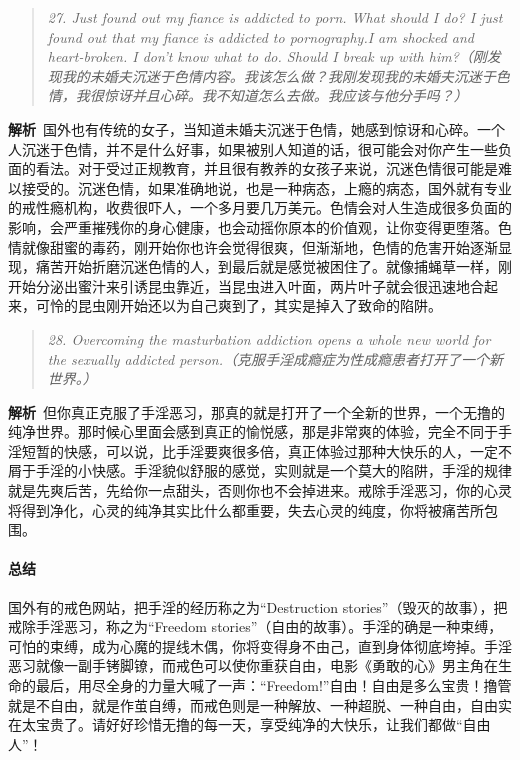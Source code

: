 \begin{quote}\it
    27. Just found out my fiance is addicted to porn. What should I do? I just found out that my fiance is addicted to pornography.I am shocked and heart-broken. I don't know what to do. Should I break up with him?（刚发现我的未婚夫沉迷于色情内容。我该怎么做？我刚发现我的未婚夫沉迷于色情，我很惊讶并且心碎。我不知道怎么去做。我应该与他分手吗？）
\end{quote}

\textbf{解析}\ 国外也有传统的女子，当知道未婚夫沉迷于色情，她感到惊讶和心碎。一个人沉迷于色情，并不是什么好事，如果被别人知道的话，很可能会对你产生一些负面的看法。对于受过正规教育，并且很有教养的女孩子来说，沉迷色情很可能是难以接受的。沉迷色情，如果准确地说，也是一种病态，上瘾的病态，国外就有专业的戒性瘾机构，收费很吓人，一个多月要几万美元。色情会对人生造成很多负面的影响，会严重摧残你的身心健康，也会动摇你原本的价值观，让你变得更堕落。色情就像甜蜜的毒药，刚开始你也许会觉得很爽，但渐渐地，色情的危害开始逐渐显现，痛苦开始折磨沉迷色情的人，到最后就是感觉被困住了。就像捕蝇草一样，刚开始分泌出蜜汁来引诱昆虫靠近，当昆虫进入叶面，两片叶子就会很迅速地合起来，可怜的昆虫刚开始还以为自己爽到了，其实是掉入了致命的陷阱。

\begin{quote}\it
    28. Overcoming the masturbation addiction opens a whole new world for the sexually addicted person.（克服手淫成瘾症为性成瘾患者打开了一个新世界。）
\end{quote}

\textbf{解析}\ 但你真正克服了手淫恶习，那真的就是打开了一个全新的世界，一个无撸的纯净世界。那时候心里面会感到真正的愉悦感，那是非常爽的体验，完全不同于手淫短暂的快感，可以说，比手淫要爽很多倍，真正体验过那种大快乐的人，一定不屑于手淫的小快感。手淫貌似舒服的感觉，实则就是一个莫大的陷阱，手淫的规律就是先爽后苦，先给你一点甜头，否则你也不会掉进来。戒除手淫恶习，你的心灵将得到净化，心灵的纯净其实比什么都重要，失去心灵的纯度，你将被痛苦所包围。

\paragraph*{总结}

国外有的戒色网站，把手淫的经历称之为“Destruction stories”（毁灭的故事），把戒除手淫恶习，称之为“Freedom stories”（自由的故事）。手淫的确是一种束缚，可怕的束缚，成为心魔的提线木偶，你将变得身不由己，直到身体彻底垮掉。手淫恶习就像一副手铐脚镣，而戒色可以使你重获自由，电影《勇敢的心》男主角在生命的最后，用尽全身的力量大喊了一声：“Freedom!”自由！自由是多么宝贵！撸管就是不自由，就是作茧自缚，而戒色则是一种解放、一种超脱、一种自由，自由实在太宝贵了。请好好珍惜无撸的每一天，享受纯净的大快乐，让我们都做“自由人”！


